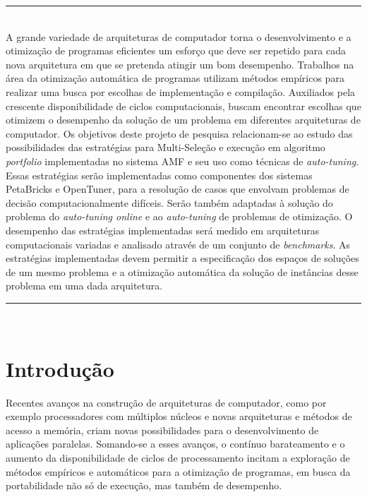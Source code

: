 \documentclass[a4paper, 12pt]{article}
\begin{document}
\abstract
\noindent
\rule{\linewidth}{.1mm} \\
\noindent
A grande variedade de arquiteturas de computador torna o desenvolvimento e a
otimização de programas eficientes um esforço que deve ser repetido para cada
nova arquitetura em que se pretenda atingir um bom desempenho.
Trabalhos na área da otimização automática de programas utilizam métodos
empíricos para realizar uma busca por escolhas de implementação e compilação.
Auxiliados pela crescente disponibilidade de ciclos computacionais,
buscam encontrar escolhas que otimizem o desempenho da solução de um problema
em diferentes arquiteturas de computador. Os objetivos deste projeto de
pesquisa relacionam-se ao estudo das possibilidades das estratégias para
Multi-Seleção e execução em algoritmo \emph{portfolio} implementadas no sistema
AMF e seu uso como técnicas de \emph{auto-tuning}.
Essas estratégias serão implementadas como componentes dos sistemas PetaBricks
e OpenTuner, para a resolução de casos que envolvam problemas de decisão
computacionalmente difíceis.
Serão também adaptadas à solução do problema do \emph{auto-tuning online} e ao
\emph{auto-tuning} de problemas de otimização.
O desempenho das estratégias implementadas será medido em arquiteturas
computacionais variadas e analisado através de um conjunto de
\emph{benchmarks}. As estratégias implementadas devem permitir a especificação
dos espaços de soluções de um mesmo problema e a otimização automática da
solução de instâncias desse problema em uma dada arquitetura.

\noindent
\rule{\linewidth}{.1mm} \\

\tableofcontents

\newpage

\section{Introdução} \label{sec:intro}

Recentes avanços na construção de arquiteturas de computador, como
por exemplo processadores com múltiplos núcleos e novas arquiteturas
e métodos de acesso a memória, criam novas possibilidades para o
desenvolvimento de aplicações paralelas. Somando-se a esses avanços, o contínuo
barateamento e o aumento da disponibilidade de ciclos de processamento incitam
a exploração de métodos empíricos e automáticos para a otimização de programas,
em busca da portabilidade não só de execução, mas também de desempenho.
\end{document}
